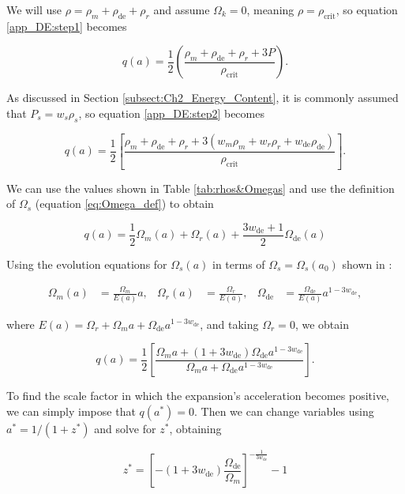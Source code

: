 \documentclass[openany,a4paper,12pt,oneside]{book}
\begin{document}
\begin{spacing}{1.5}
We will use $\rho=\rho_m+\rho_\text{de}+\rho_r$ and assume $\Omega_k=0$, meaning $\rho=\rho_\text{crit}$, so equation \eqref{app_DE:step1} becomes

\begin{equation}\label{app_DE:step2}
	q(a)=\frac{1}{2}\left(\frac{\rho_m+\rho_\text{de}+\rho_r+3P}{\rho_\text{crit}}\right).
\end{equation}

As discussed in Section \ref{subsect:Ch2_Energy_Content}, it is commonly assumed that $P_s=w_s\rho_s$, so equation \eqref{app_DE:step2} becomes

\begin{equation}\label{app_DE:step3}
	q(a)=\frac{1}{2}\left[\frac{\rho_m+\rho_\text{de}+\rho_r+3(w_m\rho_m+w_r\rho_r+w_\text{de}\rho_\text{de})}{\rho_\text{crit}}\right].
\end{equation}

We can use the values shown in Table \ref{tab:rhos&Omegas} and use the definition of $\Omega_s$ (equation \eqref{eq:Omega_def}) to obtain

\begin{equation}\label{q(a)_expression}
	q(a)=\frac{1}{2}\Omega_m(a)+\Omega_r(a)+\frac{3w_\text{de}+1}{2}\Omega_\text{de}(a)
\end{equation}

Using the evolution equations for $\Omega_s(a)$ in terms of $\Omega_s=\Omega_s(a_0)$ shown in \cite{dark_energy_era}:

\begin{align}\label{evolution_eqs}
	\Omega_m(a)&=\frac{\Omega_m}{E(a)}a, & \Omega_r(a)&=\frac{\Omega_r}{E(a)}, & \Omega_\text{de}&=\frac{\Omega_\text{de}}{E(a)}a^{1-3w_\text{de}},
\end{align}

\noindent where $E(a)=\Omega_r+\Omega_m a +\Omega_\text{de}a^{1-3w_\text{de}}$, and taking $\Omega_r=0$, we obtain

\begin{equation}\label{app_DE:step4}
	q(a)=\frac{1}{2}\left[\frac{\Omega_m a+(1+3w_\text{de})\Omega_\text{de}a^{1-3w_\text{de}}}{\Omega_m a +\Omega_\text{de}a^{1-3w_\text{de}}}\right].
\end{equation}

To find the scale factor in which the expansion's acceleration becomes positive, we can simply impose that $q(a^*)=0$. Then we can change variables using $a^*=1/(1+z^*)$ and solve for $z^*$, obtaining

\begin{equation}
	z^*=\left[-(1+3w_\text{de})\frac{\Omega_\text{de}}{\Omega_m}\right]^{-\frac{1}{3w_\text{de}}}-1
\end{equation}


\end{spacing}
\end{document}
